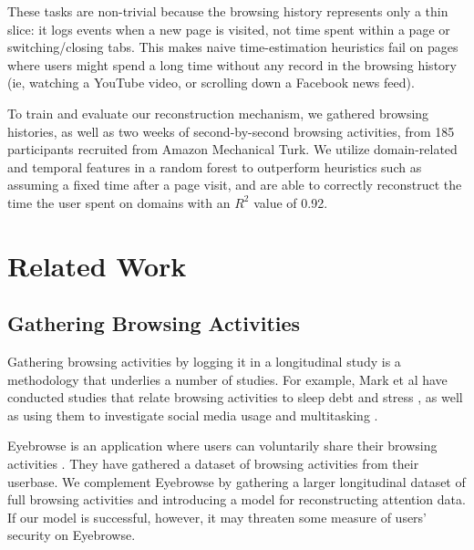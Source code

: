 \documentclass{sigchi}
\begin{document}
These tasks are non-trivial because the browsing history represents only a thin slice: it logs events when a new page is visited, not time spent within a page or switching/closing tabs. This makes naive time-estimation heuristics fail on pages where users might spend a long time without any record in the browsing history (ie, watching a YouTube video, or scrolling down a Facebook news feed).

To train and evaluate our reconstruction mechanism, we gathered browsing histories, as well as two weeks of second-by-second browsing activities, from 185 participants recruited from Amazon Mechanical Turk. We utilize domain-related and temporal features in a random forest to outperform heuristics such as assuming a fixed time after a page visit, and are able to correctly reconstruct the time the user spent on domains with an $R^2$ value of 0.92. %

\pagebreak

\section{Related Work}

\subsection{Gathering Browsing Activities}

Gathering browsing activities by logging it in a longitudinal study is a methodology that underlies a number of studies. For example, Mark et al have conducted studies that relate browsing activities to sleep debt \cite{mark2016sleep} and stress \cite{mark2014stress}, as well as using them to investigate social media usage \cite{wang2015coming} and multitasking \cite{mark2015focused}.

Eyebrowse is an application where users can voluntarily share their browsing activities \cite{eyebrowse}. They have gathered a dataset of browsing activities from their userbase. %
We complement Eyebrowse by gathering a larger longitudinal dataset of full browsing activities and introducing a model for reconstructing attention data. If our model is successful, however, it may threaten some measure of users' security on Eyebrowse.
\end{document}
